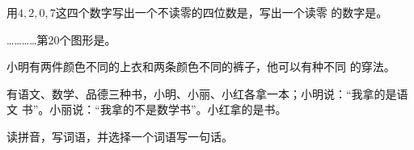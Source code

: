 \documentclass[a4paper, answer, zihao = -4, unicodeGBMath, fontset=sourcesans, %
]{ctexart}
\begin{document}

\begin{qus}
\item 用$4,2,0,7$这四个数字写出一个不读零的四位数是，写出一个读零
  的数字是。
  
\item {}…………第20个图形是。

  \item 小明有两件颜色不同的上衣和两条颜色不同的裤子，他可以有种不同
    的穿法。

\item 有语文、数学、品德三种书，小明、小丽、小红各拿一本；小明说：“我拿的是语文
  书”。小丽说：“我拿的不是数学书”。小红拿的是书。

\item 读拼音，写词语，并选择一个词语写一句话。 %


\end{qus}
\end{document}
